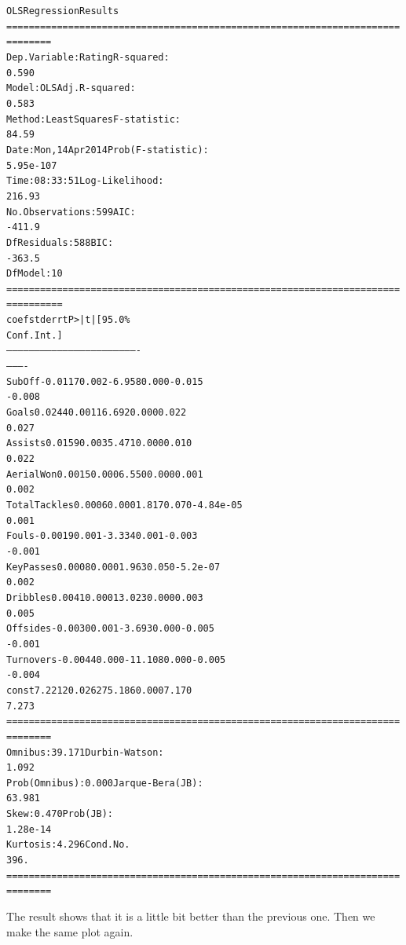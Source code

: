 \documentclass[letterpaper,10pt,english]{/usr/local/lib/python2.7/dist-packages/sphinx/texinputs/sphinxhowto}
\newenvironment{InvisibleVerbatim}
        {\begin{mdframed}[leftmargin=0.1\linewidth,innerleftmargin=3pt,innerrightmargin=3pt, userdefinedwidth=1\linewidth, linewidth=0pt, linecolor=white, usetwoside=false]}
        {\end{mdframed}}
\begin{document}
                \begin{InvisibleVerbatim}
                \vspace{-0.5\baselineskip}
\begin{alltt}                            OLS Regression Results
======================================================================
========
Dep. Variable:                 Rating   R-squared:
0.590
Model:                            OLS   Adj. R-squared:
0.583
Method:                 Least Squares   F-statistic:
84.59
Date:                Mon, 14 Apr 2014   Prob (F-statistic):
5.95e-107
Time:                        08:33:51   Log-Likelihood:
216.93
No. Observations:                 599   AIC:
-411.9
Df Residuals:                     588   BIC:
-363.5
Df Model:                          10
======================================================================
==========
                   coef    std err          t      P>|t|      [95.0\%
Conf. Int.]
----------------------------------------------------------------------
----------
SubOff          -0.0117      0.002     -6.958      0.000        -0.015
-0.008
Goals            0.0244      0.001     16.692      0.000         0.022
0.027
Assists          0.0159      0.003      5.471      0.000         0.010
0.022
AerialWon        0.0015      0.000      6.550      0.000         0.001
0.002
TotalTackles     0.0006      0.000      1.817      0.070     -4.84e-05
0.001
Fouls           -0.0019      0.001     -3.334      0.001        -0.003
-0.001
KeyPasses        0.0008      0.000      1.963      0.050      -5.2e-07
0.002
Dribbles         0.0041      0.000     13.023      0.000         0.003
0.005
Offsides        -0.0030      0.001     -3.693      0.000        -0.005
-0.001
Turnovers       -0.0044      0.000    -11.108      0.000        -0.005
-0.004
const            7.2212      0.026    275.186      0.000         7.170
7.273
======================================================================
========
Omnibus:                       39.171   Durbin-Watson:
1.092
Prob(Omnibus):                  0.000   Jarque-Bera (JB):
63.981
Skew:                           0.470   Prob(JB):
1.28e-14
Kurtosis:                       4.296   Cond. No.
396.
======================================================================
========
\end{alltt}

            \end{InvisibleVerbatim}
            
        
    
The result shows that it is a little bit better than the previous one.
Then we make the same plot again.
\end{document}
